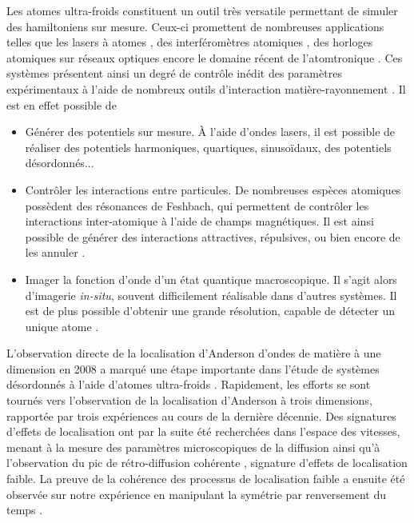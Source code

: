 Les atomes ultra-froids constituent un outil très versatile permettant de simuler des hamiltoniens sur mesure. Ceux-ci promettent de nombreuses applications telles que les lasers à atomes \citep{robins2013atom}, des interféromètres atomiques \citep{canuel2014matter}, des horloges atomiques sur réseaux optiques \citep{derevianko2011colloquium} encore le domaine récent de l'atomtronique \citep{eckel2014hysteresis}. Ces systèmes présentent ainsi un degré de contrôle inédit des paramètres expérimentaux à l'aide de nombreux outils d'interaction matière-rayonnement \citep{bloch2012quantum}. Il est en effet possible de
\begin{itemize}
\item[\textendash] Générer des potentiels sur mesure. À l'aide d'ondes lasers, il est possible de réaliser des potentiels harmoniques, quartiques, sinusoïdaux, des potentiels désordonnés...
\item[\textendash] Contrôler les interactions entre particules. De nombreuses espèces atomiques possèdent des résonances de Feshbach, qui permettent de contrôler les interactions inter-atomique à l'aide de champs magnétiques. Il est ainsi possible de générer des interactions attractives, répulsives, ou bien encore de les annuler \citep{walraven2010elements}.
\item[\textendash] Imager la fonction d'onde d'un état quantique macroscopique. Il s'agit alors d'imagerie \emph{in-situ}, souvent difficilement réalisable dans d'autres systèmes. Il est de plus possible d'obtenir une grande résolution, capable de détecter un unique atome \citep{ott2016single}.
\end{itemize}



L'observation directe de la localisation d'Anderson d'ondes de matière à une dimension en 2008 a marqué une étape importante dans l'étude de systèmes désordonnés à l'aide d'atomes ultra-froids \citep{roati2008anderson}\citep{billy2008direct}. Rapidement, les efforts se sont tournés vers l'observation de la localisation d'Anderson à trois dimensions, rapportée par trois expériences \citep{kondov2011three}\citep{jendrzejewski2012three}\citep{semeghini2015measurement} au cours de la dernière décennie. Des signatures d'effets de localisation ont par la suite été recherchées dans l'espace des vitesses, menant à la mesure des paramètres microscopiques de la diffusion \citep{richard2019elastic} ainsi qu'à l'observation du pic de rétro-diffusion cohérente \citep{jendrzejewski2012coherent}, signature d'effets de localisation faible. La preuve de la cohérence des processus de localisation faible a ensuite été observée sur notre expérience en manipulant la symétrie par renversement du temps \citep{muller2015suppression}. 

